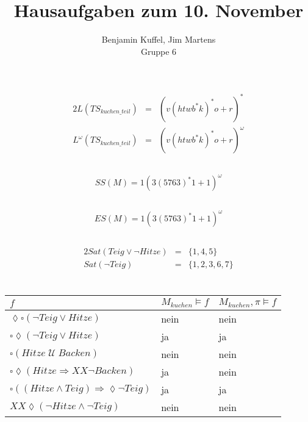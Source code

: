 \documentclass[10pt,a4paper,oneside,ngerman,numbers=noenddot]{scrartcl}
\begin{document}
\author{Benjamin Kuffel, Jim Martens\\Gruppe 6}
\title{Hausaufgaben zum 10. November}
\maketitle

\setcounter{section}{2}
\section{} %
	\subsection{}
	\begin{alignat*}{2}
		L(TS_{kuchen\_teil}) &=& (v(htwb^{*}k)^{*}o + r)^{*} \\
		L^{\omega}(TS_{kuchen\_teil}) &=& (v(htwb^{*}k)^{*}o + r)^{\omega}
	\end{alignat*}
	\subsection{}
	\[
		SS(M) = 1(3(5763)^{*}1 + 1)^{\omega}
	\]
	\subsection{}
	\[
		ES(M) = 1(3(5763)^{*}1 + 1)^{\omega}
	\]
	\subsection{}
	\begin{alignat*}{2}
		Sat(Teig \vee \lnot Hitze) &=& \{1, 4, 5\} \\
		Sat(\lnot Teig) &=& \{1, 2, 3, 6, 7\}
	\end{alignat*}	
	
\section{} %
	\begin{tabular}{l|l|l}
		\(f\) & \(M_{kuchen} \models f \) & \(M_{kuchen}, \pi \models f\)\\
		\hline
		\(\lozenge \square(\lnot Teig \vee Hitze) \)& nein & nein \\
		\(\square	\lozenge(\lnot Teig \vee Hitze)\) & ja & ja \\
		\(\square	(Hitze \;\mathcal{U}\; Backen)\) & nein & nein \\
		\(\square	\lozenge (Hitze \Rightarrow XX\lnot Backen)\) & ja & nein \\
		\(\square ((Hitze \wedge Teig) \Rightarrow \lozenge \lnot Teig)\) & ja & ja \\
		\(XX \lozenge (\lnot Hitze \wedge \lnot Teig)\) & nein & nein  
	\end{tabular}
\end{document}
